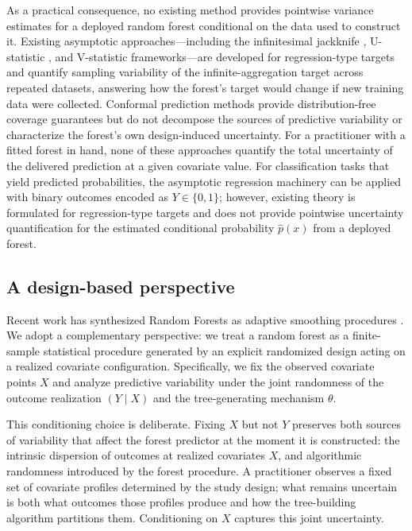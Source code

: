 \documentclass[11pt]{article}
\theoremstyle{plain}
\theoremstyle{definition}
\theoremstyle{remark}
\begin{document}
As a practical consequence, no existing method provides pointwise variance estimates for a deployed random forest conditional on the data used to construct it. Existing asymptotic approaches---including the infinitesimal jackknife \citep{wager2014}, U-statistic \citep{mentch2016}, and V-statistic \citep{zhou2021v} frameworks---are developed for regression-type targets and quantify sampling variability of the infinite-aggregation target across repeated datasets, answering how the forest's target would change if new training data were collected. Conformal prediction methods \citep{lei2018,romano2019} provide distribution-free coverage guarantees but do not decompose the sources of predictive variability or characterize the forest's own design-induced uncertainty. For a practitioner with a fitted forest in hand, none of these approaches quantify the total uncertainty of the delivered prediction at a given covariate value. For classification tasks that yield predicted probabilities, the asymptotic regression machinery can be applied with binary outcomes encoded as $Y \in \{0,1\}$; however, existing theory is formulated for regression-type targets and does not provide pointwise uncertainty quantification for the estimated conditional probability $\hat{p}(x)$ from a deployed forest.

\subsection{A design-based perspective}

Recent work has synthesized Random Forests as adaptive smoothing procedures \citep{curth2024}. We adopt a complementary perspective: we treat a random forest as a finite-sample statistical procedure generated by an explicit randomized design acting on a realized covariate configuration. Specifically, we fix the observed covariate points $X$ and analyze predictive variability under the joint randomness of the outcome realization $(Y \mid X)$ and the tree-generating mechanism $\theta$.

This conditioning choice is deliberate. Fixing $X$ but not $Y$ preserves both sources of variability that affect the forest predictor at the moment it is constructed: the intrinsic dispersion of outcomes at realized covariates $X$, and algorithmic randomness introduced by the forest procedure. A practitioner observes a fixed set of covariate profiles determined by the study design; what remains uncertain is both what outcomes those profiles produce and how the tree-building algorithm partitions them. Conditioning on $X$ captures this joint uncertainty.
\end{document}

